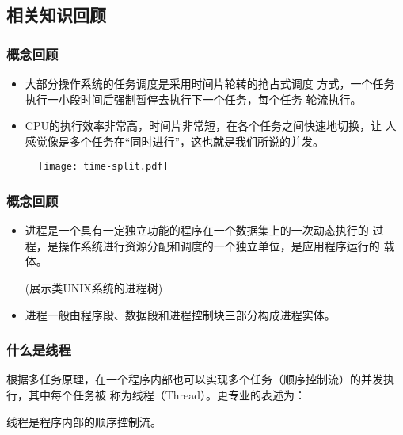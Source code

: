 \subsection{相关知识回顾}

\begin{frame}[fragile]
  \frametitle{概念回顾}

  
  \begin{itemize}
  \item 大部分操作系统的任务调度是采用{\hei\Red 时间片轮转的抢占式调度
      方式}，一个任务执行一小段时间后强制暂停去执行下一个任务，每个任务
    轮流执行。
  \item CPU的执行效率非常高，时间片非常短，在各个任务之间快速地切换，让
    人感觉像是多个任务在“同时进行”，这也就是我们所说的{\hei\Red 并发}。
  \end{itemize}

  \begin{figure}
    \centering
    \texttt{[image: time-split.pdf]}
  \end{figure}
\end{frame}

\begin{frame}[fragile]
  \frametitle{概念回顾}

  
  \begin{itemize}
  \item 进程是一个具有一定独立功能的程序在一个数据集上的一次动态执行的
    过程，是操作系统进行资源分配和调度的一个独立单位，是应用程序运行的
    载体。

    {\kai\Red (展示类UNIX系统的进程树)}
    
  \item 进程一般由{\hei\Blue 程序段、数据段和进程控制块}三部分构成进程实体。
  \end{itemize}
\end{frame}


\begin{frame}[fragile] %
  \frametitle{什么是线程}

  根据多任务原理，在一个程序内部也可以实现多个任务（顺序控制流）的并发执行，其中每个任务被
  称为{\hei\Red 线程（Thread）}。更专业的表述为：

  {\Blue\hei 线程是程序内部的顺序控制流。}
\end{frame}

